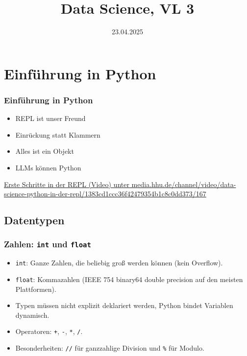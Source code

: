 

\title{Data Science, VL 3} %
\date{23.04.2025}



\begin{frame}
  \titlepage
\end{frame}


\section{Einführung in Python}

\begin{frame}
  \frametitle{Einführung in Python}
  \begin{itemize}[<+->]
  \item REPL ist unser Freund
  \item Einrückung statt Klammern
  \item Alles ist ein Objekt
  \item LLMs können Python
  \end{itemize}
  \bigskip
  \href{https://media.hhu.de/channel/video/data-science-python-in-der-repl/1383cd1ccc36f42479354b1c8c0dd373/167}{Erste Schritte in der REPL (Video) unter media.hhu.de/channel/video/data-science-python-in-der-repl/1383cd1ccc36f42479354b1c8c0dd373/167}
\end{frame}

\subsection{Datentypen}

\begin{frame}
  \frametitle{Zahlen: \texttt{int} und \texttt{float}}
  \begin{itemize}[<+->]
  \item \texttt{int}: Ganze Zahlen, die beliebig groß werden können (kein Overflow).
  \item \texttt{float}: Kommazahlen (IEEE 754 binary64 double precision auf den meisten Plattformen).
  \item Typen müssen nicht explizit deklariert werden, Python bindet Variablen dynamisch.
  \item Operatoren: \texttt{+}, \texttt{-}, \texttt{*}, \texttt{/}.
  \item Besonderheiten: \texttt{//} für ganzzahlige Division und \texttt{\%} für Modulo.
  \end{itemize}
\end{frame}

